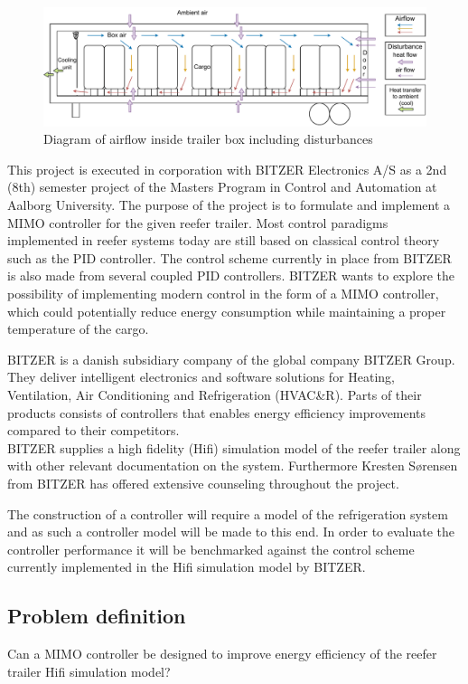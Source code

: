 \begin{figure}[h]
	\centering
	\includegraphics[width = 0.8\linewidth]{Graphics/Trailer_airflow.pdf}
	\caption{Diagram of airflow inside trailer box including disturbances}
	\label{fig:trailer_airflow}
\end{figure}

This project is executed in corporation with BITZER Electronics A/S as a 2nd (8th) semester project of the Masters Program in Control and Automation at Aalborg University. The purpose of the project is to formulate and implement a MIMO controller for the given reefer trailer. Most control paradigms implemented in reefer systems today are still based on classical control theory such as the PID controller. The control scheme currently in place from BITZER is also made from several coupled PID controllers. BITZER wants to explore the possibility of implementing modern control in the form of a MIMO controller, which could potentially reduce energy consumption while maintaining a proper temperature of the cargo.

BITZER is a danish subsidiary company of the global company BITZER Group. They deliver intelligent electronics and software solutions for Heating, Ventilation, Air Conditioning and Refrigeration (HVAC\&R). Parts of their products consists of controllers that enables energy efficiency improvements compared to their competitors. \\

BITZER supplies a high fidelity (Hifi) simulation model of the reefer trailer along with other relevant documentation on the system. Furthermore Kresten Sørensen from BITZER has offered extensive counseling throughout the project.

The construction of a controller will require a model of the refrigeration system and as such a controller model will be made to this end. In order to evaluate the controller performance it will be benchmarked against the control scheme currently implemented in the Hifi simulation model by BITZER. 

\subsection{Problem definition}
Can a MIMO controller be designed to improve energy efficiency of the reefer trailer Hifi simulation model?